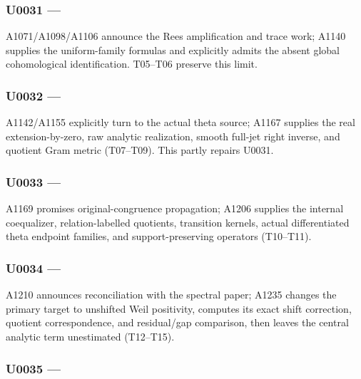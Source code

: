 \documentclass[10pt,a4paper,oneside]{report}
\begin{document}
\subsubsection{\texorpdfstring{U0031 ---
\protect{}}{U0031 --- }}\label{u0031-fd1d4ef4-537b-4bca-8d5b-0cb82a441737}

A1071/A1098/A1106 announce the Rees amplification and trace work; A1140
supplies the uniform-family formulas and explicitly admits the absent
global cohomological identification. T05--T06 preserve this limit.

\subsubsection{\texorpdfstring{U0032 ---
\protect{}}{U0032 --- }}\label{u0032-f4609209-f2cd-4dbc-8ec2-a8995aedc998}

A1142/A1155 explicitly turn to the actual theta source; A1167 supplies
the real extension-by-zero, raw analytic realization, smooth full-jet
right inverse, and quotient Gram metric (T07--T09). This partly repairs
U0031.

\subsubsection{\texorpdfstring{U0033 ---
\protect{}}{U0033 --- }}\label{u0033-622780af-97a6-4c56-987c-135df8409461}

A1169 promises original-congruence propagation; A1206 supplies the
internal coequalizer, relation-labelled quotients, transition kernels,
actual differentiated theta endpoint families, and support-preserving
operators (T10--T11).

\subsubsection{\texorpdfstring{U0034 ---
\protect{}}{U0034 --- }}\label{u0034-b5ee7e11-a089-4433-af7a-ede73bbc5bcf}

A1210 announces reconciliation with the spectral paper; A1235 changes
the primary target to unshifted Weil positivity, computes its exact
shift correction, quotient correspondence, and residual/gap comparison,
then leaves the central analytic term unestimated (T12--T15).

\subsubsection{\texorpdfstring{U0035 ---
\protect{}}{U0035 --- }}\label{u0035-7b9f7612-3a57-4687-9bfb-39d1d933baf8}
\end{document}
